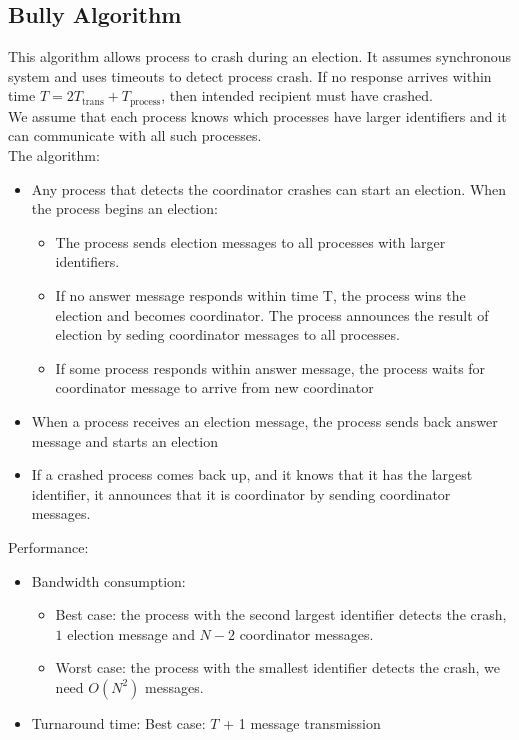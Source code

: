 \begin{multicols*}{2}
\subsection{Bully Algorithm}

\noindent This algorithm allows process to crash during an election. It assumes synchronous system and uses timeouts to detect process crash. If no response arrives within time $T=2T_{\text{trans}} + T_{\text{process}}$, then intended recipient must have crashed.\\

\noindent We assume that each process knows which processes have larger identifiers and it can communicate with all such processes.\\

\noindent The algorithm:

\begin{itemize}
  \item Any process that detects the coordinator crashes can start an election. When the process begins an election:
  \begin{itemize}
    \item The process sends election messages to all processes with larger identifiers.
    \item If no answer message responds within time T, the process wins the election and becomes coordinator. The process announces the result of election by seding coordinator messages to all processes.
    \item If some process responds within answer message, the process waits for coordinator message to arrive from new coordinator
  \end{itemize}
  \item When a process receives an election message, the process sends back answer message and starts an election
  \item If a crashed process comes back up, and it knows that it has the largest identifier, it announces that it is coordinator by sending coordinator messages.
\end{itemize}

\noindent Performance:
\begin{itemize}
  \item Bandwidth consumption: 
  \begin{itemize}
    \item Best case: the process with the second largest identifier detects the crash, $1$ election message and $N-2$ coordinator messages.
    \item Worst case: the process with the smallest identifier detects the crash, we need $O(N^2)$ messages.
  \end{itemize}
  \item Turnaround time: Best case: $T$ + 1 message transmission
\end{itemize}


\end{multicols*}
